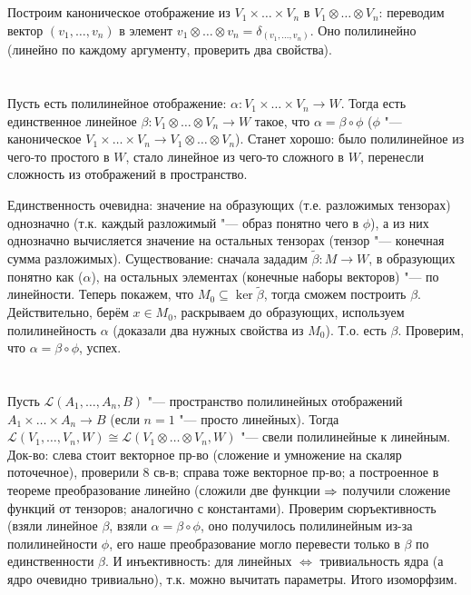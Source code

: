 \section{} %
Построим каноническое отображение из $V_1 \times \dots \times V_n$ в $V_1 \otimes \dots \otimes V_n$:
переводим вектор $(v_1, \dots, v_n)$ в элемент $v_1\otimes\dots\otimes v_n=\delta_{(v_1, \dots, v_n)}$.
Оно полилинейно (линейно по каждому аргументу, проверить два свойства).

\section{} %
Пусть есть полилинейное отображение: $\alpha \colon V_1 \times \dots \times V_n \to W$.
Тогда есть единственное линейное $\beta \colon V_1 \otimes \dots \otimes V_n \to W$ такое,
что $\alpha = \beta \circ \phi$ ($\phi$ "--- каноническое $V_1 \times \dots \times V_n \to  V_1 \otimes \dots \otimes V_n$).
Станет хорошо: было полилинейное из чего-то простого в $W$, стало линейное из чего-то сложного в $W$,
перенесли сложность из отображений в пространство.

Единственность очевидна: значение на образующих (т.е. разложимых тензорах) однозначно (т.к. каждый
разложимый "--- образ понятно чего в $\phi$), а из них однозначно вычисляется значение на остальных
тензорах (тензор "--- конечная сумма разложимых).
Существование: сначала зададим $\tilde\beta \colon M \to W$, в образующих понятно как ($\alpha$),
на остальных элементах (конечные наборы векторов) "--- по линейности.
Теперь покажем, что $M_0 \subseteq \ker \tilde\beta$, тогда сможем построить $\beta$.
Действительно, берём $x \in M_0$, раскрываем до образующих, используем полилинейность
$\alpha$ (доказали два нужных свойства из $M_0$).
Т.о. есть $\beta$.
Проверим, что $\alpha = \beta \circ \phi$, успех.

\section{} %
Пусть $\mathcal L(A_1, \dots, A_n, B)$ "--- пространство полилинейных отображений $A_1 \times \dots \times A_n \to B$
(если $n=1$ "--- просто линейных).
Тогда $\mathcal L(V_1, \dots, V_n, W) \cong \mathcal L (V_1 \otimes \dots \otimes V_n, W)$ "--- свели полилинейные к линейным.
Док-во: слева стоит векторное пр-во (сложение и умножение на скаляр поточечное), проверили 8 св-в;
справа тоже векторное пр-во; а построенное в теореме преобразование линейно (сложили две функции $\Rightarrow$
получили сложение функций от тензоров; аналогично с константами).
Проверим сюръективность (взяли линейное $\beta$, взяли $\alpha=\beta \circ \phi$, оно получилось
полилинейным из-за полилинейности $\phi$, его наше преобразование могло перевести только в $\beta$ по единственности
$\beta$.
И инъективность: для линейных $\iff$ тривиальность ядра (а ядро очевидно тривиально),
т.к. можно вычитать параметры.
Итого изоморфзим.

\section{} %
\TODO

\section{} %
\TODO

\section{} %
\TODO
